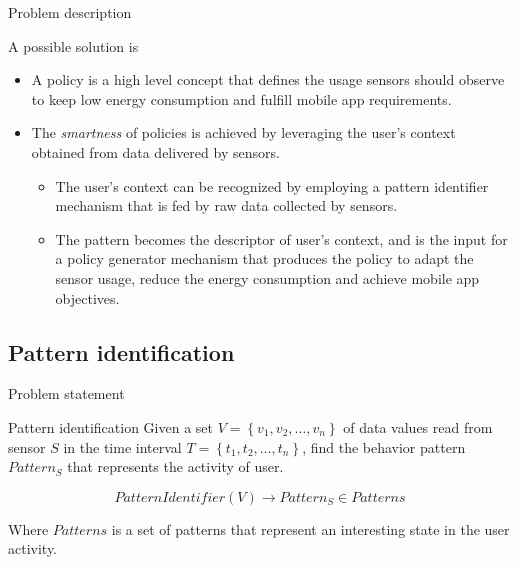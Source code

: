 \begin{frame}{Problem description}
  \begin{block}{A possible solution is}
    \begin{itemize}
      \item A policy is a high level concept that defines the usage sensors should observe to keep low energy consumption and fulfill mobile app requirements.

      \item The \emph{smartness} of policies is achieved by leveraging the user’s context obtained from data delivered by sensors.
      \begin{itemize}
        \item The user’s context can be recognized by employing a pattern identifier mechanism that is fed by raw data collected by sensors.

        \item The pattern becomes the descriptor of user’s context, and is the input for a policy generator mechanism that produces the policy to adapt the sensor usage, reduce the energy consumption and achieve mobile app objectives.
      \end{itemize}
      
    \end{itemize}
  \end{block}
\end{frame}


\subsection{Pattern identification}

\begin{frame}{Problem statement}
  \begin{exampleblock}{Pattern identification}
    Given a set $V = \left\{v_{1}, v_{2}, \dotsc, v_{n}\right\}$ of data values read from sensor $S$ in the time interval $T = \left\{t_{1}, t_{2}, \dotsc, t_{n}\right\}$, find the behavior pattern $Pattern_{S}$ that represents the activity of user.

    \begin{equation}
      PatternIdentifier( V ) \longrightarrow{} Pattern_{S} \in Patterns
    \end{equation}

    Where $Patterns$ is a set of patterns that represent an interesting state in the user activity.
  \end{exampleblock}
\end{frame}


